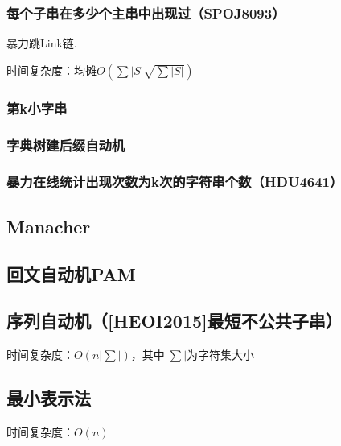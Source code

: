 \documentclass[landscape,twoside,a4paper]{article}
\begin{document}
\subsubsection{每个子串在多少个主串中出现过（SPOJ8093）}
暴力跳Link链.\par
时间复杂度：$均摊O(\sum |S|\sqrt{\sum |S|})$


\subsubsection{第k小字串}


\subsubsection{字典树建后缀自动机}


\subsubsection{暴力在线统计出现次数为k次的字符串个数（HDU4641）}



\subsection{Manacher}


\subsection{回文自动机PAM}



\subsection{序列自动机（[HEOI2015]最短不公共子串）}
时间复杂度：$O(n|\sum|)$，其中$|\sum|$为字符集大小


\subsection{最小表示法}
时间复杂度：$O(n)$

\end{document}
